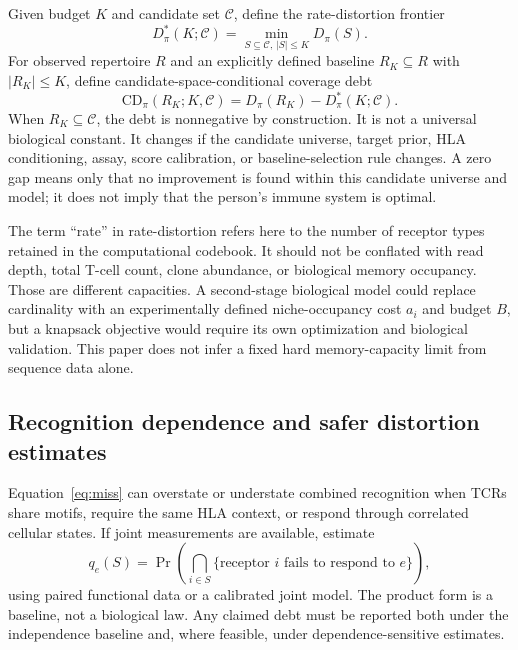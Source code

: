 \documentclass[11pt]{article}
\begin{document}
Given budget $K$ and candidate set $\mathcal{C}$, define the rate-distortion frontier
\begin{equation}
D^*_{\pi}(K;\mathcal{C})=\min_{S\subseteq\mathcal{C},\,|S|\leq K}D_\pi(S).
\label{eq:frontier}
\end{equation}
For observed repertoire $R$ and an explicitly defined baseline $R_K\subseteq R$ with $|R_K|\leq K$, define candidate-space-conditional coverage debt
\begin{equation}
\mathrm{CD}_{\pi}(R_K;K,\mathcal{C})=D_\pi(R_K)-D^*_{\pi}(K;\mathcal{C}).
\label{eq:debt}
\end{equation}
When $R_K\subseteq\mathcal{C}$, the debt is nonnegative by construction. It is not a universal biological constant. It changes if the candidate universe, target prior, HLA conditioning, assay, score calibration, or baseline-selection rule changes. A zero gap means only that no improvement is found within this candidate universe and model; it does not imply that the person's immune system is optimal.

The term ``rate'' in rate-distortion refers here to the number of receptor types retained in the computational codebook. It should not be conflated with read depth, total T-cell count, clone abundance, or biological memory occupancy. Those are different capacities. A second-stage biological model could replace cardinality with an experimentally defined niche-occupancy cost $a_i$ and budget $B$, but a knapsack objective would require its own optimization and biological validation. This paper does not infer a fixed hard memory-capacity limit from sequence data alone.

\subsection{Recognition dependence and safer distortion estimates}
Equation~\eqref{eq:miss} can overstate or understate combined recognition when TCRs share motifs, require the same HLA context, or respond through correlated cellular states. If joint measurements are available, estimate
\begin{equation}
q_e(S)=\Pr\!\left(\bigcap_{i\in S}\{\text{receptor }i\text{ fails to respond to }e\}\right),
\label{eq:joint}
\end{equation}
using paired functional data or a calibrated joint model. The product form is a baseline, not a biological law. Any claimed debt must be reported both under the independence baseline and, where feasible, under dependence-sensitive estimates.
\end{document}
